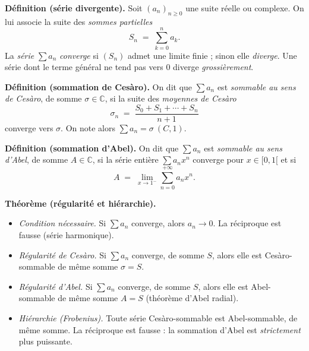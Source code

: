 



\begin{tcolorbox}[thmbox]
  \textbf{Définition (série divergente).}\enspace{}
  Soit $(a_n)_{n\geq 0}$ une suite réelle ou complexe. On lui associe la suite
  des \emph{sommes partielles}
  \[
    S_n \;=\; \sum_{k=0}^{n} a_k .
  \]
  La \emph{série} $\sum a_n$ \emph{converge} si $(S_n)$ admet une limite finie ;
  sinon elle \emph{diverge}. Une série dont le terme général ne tend pas vers $0$
  diverge \emph{grossièrement}.

  \medskip
  \textbf{Définition (sommation de Cesàro).}\enspace{}
  On dit que $\sum a_n$ est \emph{sommable au sens de Cesàro}, de somme
  $\sigma\in\mathbb{C}$, si la suite des \emph{moyennes de Cesàro}
  \[
    \sigma_n \;=\; \frac{S_0+S_1+\cdots+S_n}{n+1}
  \]
  converge vers $\sigma$. On note alors $\displaystyle\sum a_n = \sigma\ (C,1)$.

  \medskip
  \textbf{Définition (sommation d'Abel).}\enspace{}
  On dit que $\sum a_n$ est \emph{sommable au sens d'Abel}, de somme
  $A\in\mathbb{C}$, si la série entière $\sum a_n x^n$ converge pour
  $x\in[0,1[$ et si
  \[
    A \;=\; \lim_{x\to 1^{-}} \sum_{n=0}^{+\infty} a_n x^n .
  \]

  \medskip
  \textbf{Théorème (régularité et hiérarchie).}
  \begin{itemize}
    \item \textit{Condition nécessaire.} Si $\sum a_n$ converge, alors
    $a_n\to 0$. La réciproque est fausse (série harmonique).
    \item \textit{Régularité de Cesàro.} Si $\sum a_n$ converge, de somme $S$,
    alors elle est Cesàro-sommable de même somme $\sigma=S$.
    \item \textit{Régularité d'Abel.} Si $\sum a_n$ converge, de somme $S$,
    alors elle est Abel-sommable de même somme $A=S$ (théorème d'Abel radial).
    \item \textit{Hiérarchie (Frobenius).} Toute
    série Cesàro-sommable est Abel-sommable, de même somme. La réciproque est
    fausse : la sommation d'Abel est \emph{strictement} plus puissante.
  \end{itemize}
\end{tcolorbox}

